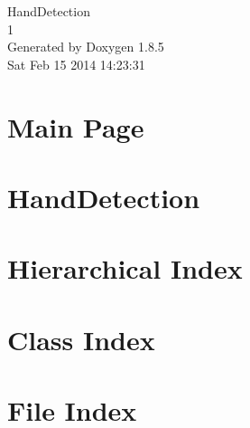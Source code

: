 \documentclass[twoside]{book}
\newcommand{\clearemptydoublepage}{%
  \newpage{\pagestyle{empty}\cleardoublepage}%
}
\begin{document}
\hypersetup{pageanchor=false}
\begin{titlepage}
\vspace*{7cm}
\begin{center}%
{\Large Hand\-Detection \\[1ex]\large 1 }\\
\vspace*{1cm}
{\large Generated by Doxygen 1.8.5}\\
\vspace*{0.5cm}
{\small Sat Feb 15 2014 14:23:31}\\
\end{center}
\end{titlepage}
\clearemptydoublepage
\tableofcontents
\clearemptydoublepage
{}
\hypersetup{pageanchor=true}

\chapter{Main Page}
\label{index}\hypertarget{index}{}
\chapter{Hand\-Detection}
\label{md___users_raphaeldendooven__documents_school_2013-2014__thesis__master__programs__hand_detection__r_e_a_d_m_e}
\hypertarget{md___users_raphaeldendooven__documents_school_2013-2014__thesis__master__programs__hand_detection__r_e_a_d_m_e}{}

\chapter{Hierarchical Index}

\chapter{Class Index}

\chapter{File Index}

\end{document}
